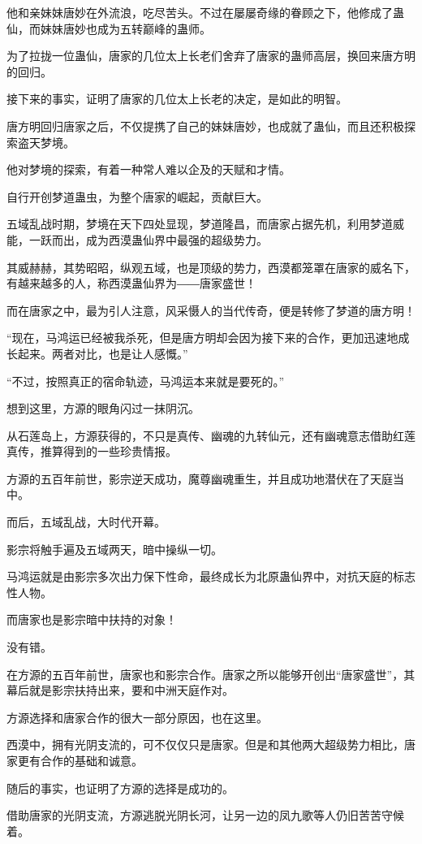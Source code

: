 \begin{this_body}
他和亲妹妹唐妙在外流浪，吃尽苦头。不过在屡屡奇缘的眷顾之下，他修成了蛊仙，而妹妹唐妙也成为五转巅峰的蛊师。

为了拉拢一位蛊仙，唐家的几位太上长老们舍弃了唐家的蛊师高层，换回来唐方明的回归。

接下来的事实，证明了唐家的几位太上长老的决定，是如此的明智。

唐方明回归唐家之后，不仅提携了自己的妹妹唐妙，也成就了蛊仙，而且还积极探索盗天梦境。

他对梦境的探索，有着一种常人难以企及的天赋和才情。

自行开创梦道蛊虫，为整个唐家的崛起，贡献巨大。

五域乱战时期，梦境在天下四处显现，梦道隆昌，而唐家占据先机，利用梦道威能，一跃而出，成为西漠蛊仙界中最强的超级势力。

其威赫赫，其势昭昭，纵观五域，也是顶级的势力，西漠都笼罩在唐家的威名下，有越来越多的人，称西漠蛊仙界为――唐家盛世！

而在唐家之中，最为引人注意，风采慑人的当代传奇，便是转修了梦道的唐方明！

“现在，马鸿运已经被我杀死，但是唐方明却会因为接下来的合作，更加迅速地成长起来。两者对比，也是让人感慨。”

“不过，按照真正的宿命轨迹，马鸿运本来就是要死的。”

想到这里，方源的眼角闪过一抹阴沉。

从石莲岛上，方源获得的，不只是真传、幽魂的九转仙元，还有幽魂意志借助红莲真传，推算得到的一些珍贵情报。

方源的五百年前世，影宗逆天成功，魔尊幽魂重生，并且成功地潜伏在了天庭当中。

而后，五域乱战，大时代开幕。

影宗将触手遍及五域两天，暗中操纵一切。

马鸿运就是由影宗多次出力保下性命，最终成长为北原蛊仙界中，对抗天庭的标志性人物。

而唐家也是影宗暗中扶持的对象！

没有错。

在方源的五百年前世，唐家也和影宗合作。唐家之所以能够开创出“唐家盛世”，其幕后就是影宗扶持出来，要和中洲天庭作对。

方源选择和唐家合作的很大一部分原因，也在这里。

西漠中，拥有光阴支流的，可不仅仅只是唐家。但是和其他两大超级势力相比，唐家更有合作的基础和诚意。

随后的事实，也证明了方源的选择是成功的。

借助唐家的光阴支流，方源逃脱光阴长河，让另一边的凤九歌等人仍旧苦苦守候着。


\end{this_body}
